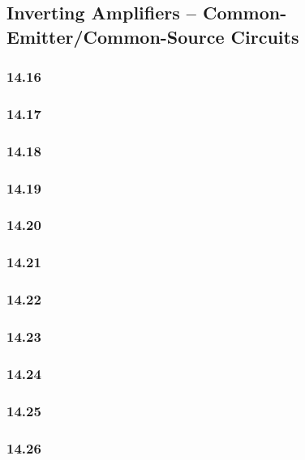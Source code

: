\documentclass[11pt,a4paper,titlepage]{article}
\begin{document}
\subsection{Inverting Amplifiers – Common-Emitter/Common-Source Circuits}

\subsubsection*{14.16}

\subsubsection*{14.17}

\subsubsection*{14.18}

\subsubsection*{14.19}

\subsubsection*{14.20}

\subsubsection*{14.21}

\subsubsection*{14.22}

\subsubsection*{14.23}

\subsubsection*{14.24}

\subsubsection*{14.25}

\subsubsection*{14.26}
\end{document}
